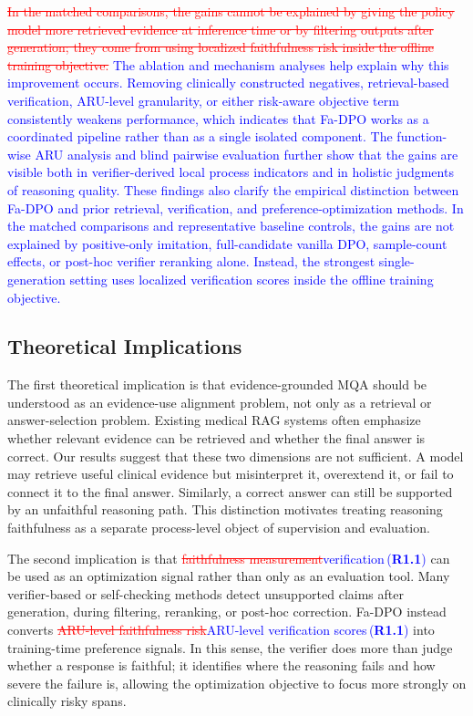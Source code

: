 \documentclass[a4paper,fleqn,doubleblind]{cas-sc}
\DeclareRobustCommand{\deleted}[1]{\textcolor{red}{\sout{#1}}}
\DeclareRobustCommand{\added}[1]{\textcolor{blue}{#1}}
\DeclareRobustCommand{\revtag}[1]{\textcolor{blue}{\scriptsize\,(\textbf{#1})}}
\begin{document}
\deleted{In the matched comparisons, the gains cannot be explained by giving the policy model more retrieved evidence at inference time or by filtering outputs after generation; they come from using localized faithfulness risk inside the offline training objective.}
\added{The ablation and mechanism analyses help explain why this improvement occurs. Removing clinically constructed negatives, retrieval-based verification, ARU-level granularity, or either risk-aware objective term consistently weakens performance, which indicates that Fa-DPO works as a coordinated pipeline rather than as a single isolated component. The function-wise ARU analysis and blind pairwise evaluation further show that the gains are visible both in verifier-derived local process indicators and in holistic judgments of reasoning quality. These findings also clarify the empirical distinction between Fa-DPO and prior retrieval, verification, and preference-optimization methods. In the matched comparisons and representative baseline controls, the gains are not explained by positive-only imitation, full-candidate vanilla DPO, sample-count effects, or post-hoc verifier reranking alone. Instead, the strongest single-generation setting uses localized verification scores inside the offline training objective.}

\subsection{Theoretical Implications}
The first theoretical implication is that evidence-grounded MQA should be understood as an evidence-use alignment problem, not only as a retrieval or answer-selection problem. Existing medical RAG systems often emphasize whether relevant evidence can be retrieved and whether the final answer is correct. Our results suggest that these two dimensions are not sufficient. A model may retrieve useful clinical evidence but misinterpret it, overextend it, or fail to connect it to the final answer. Similarly, a correct answer can still be supported by an unfaithful reasoning path. This distinction motivates treating reasoning faithfulness as a separate process-level object of supervision and evaluation.

The second implication is that \deleted{faithfulness measurement}\added{verification}\revtag{R1.1} can be used as an optimization signal rather than only as an evaluation tool. Many verifier-based or self-checking methods detect unsupported claims after generation, during filtering, reranking, or post-hoc correction. Fa-DPO instead converts \deleted{ARU-level faithfulness risk}\added{ARU-level verification scores}\revtag{R1.1} into training-time preference signals. In this sense, the verifier does more than judge whether a response is faithful; it identifies where the reasoning fails and how severe the failure is, allowing the optimization objective to focus more strongly on clinically risky spans.
\end{document}

